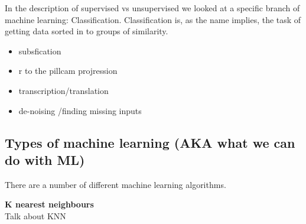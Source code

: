 	 
	In the description of supervised vs unsupervised we looked at a specific branch of machine learning: Classification. Classification is, as the name implies, the task of 
	getting data sorted in to groups of similarity. 
	  
	  
	\begin{itemize}
	    \item subsfication
	    \item r to the pillcam projression 
	    \item transcription/translation
	    \item de-noising /finding missing inputs
	\end{itemize}
	  
    \subsection{Types of machine learning (AKA what we can do with ML)}
	There are a number of different machine learning algorithms. %
	\begin{table}[ht]
	    \centering
	    \caption{Machine leaning types}
	    \label{ML-types}
	  \end{table}
	  
	  
	  \vspace{5px}
	  \textbf{K nearest neighbours}\\
	  Talk about KNN\\
		
